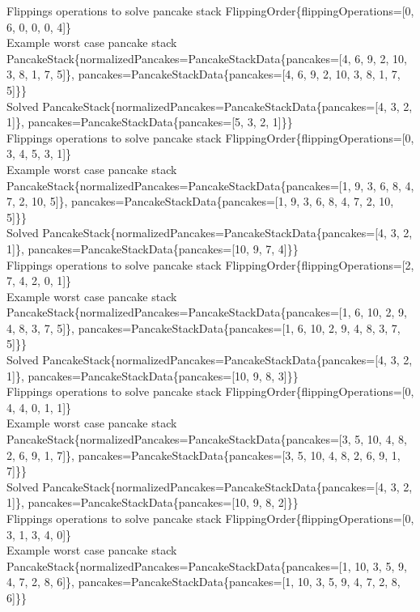 Flippings operations to solve pancake stack FlippingOrder\{flippingOperations=[0, 6, 0, 0, 0, 4]\} \\
Example worst case pancake stack PancakeStack\{normalizedPancakes=PancakeStackData\{pancakes=[4, 6, 9, 2, 10, 3, 8, 1, 7, 5]\}, pancakes=PancakeStackData\{pancakes=[4, 6, 9, 2, 10, 3, 8, 1, 7, 5]\}\} \\
Solved PancakeStack\{normalizedPancakes=PancakeStackData\{pancakes=[4, 3, 2, 1]\}, pancakes=PancakeStackData\{pancakes=[5, 3, 2, 1]\}\} \\
Flippings operations to solve pancake stack FlippingOrder\{flippingOperations=[0, 3, 4, 5, 3, 1]\} \\
Example worst case pancake stack PancakeStack\{normalizedPancakes=PancakeStackData\{pancakes=[1, 9, 3, 6, 8, 4, 7, 2, 10, 5]\}, pancakes=PancakeStackData\{pancakes=[1, 9, 3, 6, 8, 4, 7, 2, 10, 5]\}\} \\
Solved PancakeStack\{normalizedPancakes=PancakeStackData\{pancakes=[4, 3, 2, 1]\}, pancakes=PancakeStackData\{pancakes=[10, 9, 7, 4]\}\} \\
Flippings operations to solve pancake stack FlippingOrder\{flippingOperations=[2, 7, 4, 2, 0, 1]\} \\
Example worst case pancake stack PancakeStack\{normalizedPancakes=PancakeStackData\{pancakes=[1, 6, 10, 2, 9, 4, 8, 3, 7, 5]\}, pancakes=PancakeStackData\{pancakes=[1, 6, 10, 2, 9, 4, 8, 3, 7, 5]\}\} \\
Solved PancakeStack\{normalizedPancakes=PancakeStackData\{pancakes=[4, 3, 2, 1]\}, pancakes=PancakeStackData\{pancakes=[10, 9, 8, 3]\}\} \\
Flippings operations to solve pancake stack FlippingOrder\{flippingOperations=[0, 4, 4, 0, 1, 1]\} \\
Example worst case pancake stack PancakeStack\{normalizedPancakes=PancakeStackData\{pancakes=[3, 5, 10, 4, 8, 2, 6, 9, 1, 7]\}, pancakes=PancakeStackData\{pancakes=[3, 5, 10, 4, 8, 2, 6, 9, 1, 7]\}\} \\
Solved PancakeStack\{normalizedPancakes=PancakeStackData\{pancakes=[4, 3, 2, 1]\}, pancakes=PancakeStackData\{pancakes=[10, 9, 8, 2]\}\} \\
Flippings operations to solve pancake stack FlippingOrder\{flippingOperations=[0, 3, 1, 3, 4, 0]\} \\
Example worst case pancake stack PancakeStack\{normalizedPancakes=PancakeStackData\{pancakes=[1, 10, 3, 5, 9, 4, 7, 2, 8, 6]\}, pancakes=PancakeStackData\{pancakes=[1, 10, 3, 5, 9, 4, 7, 2, 8, 6]\}\} \\
